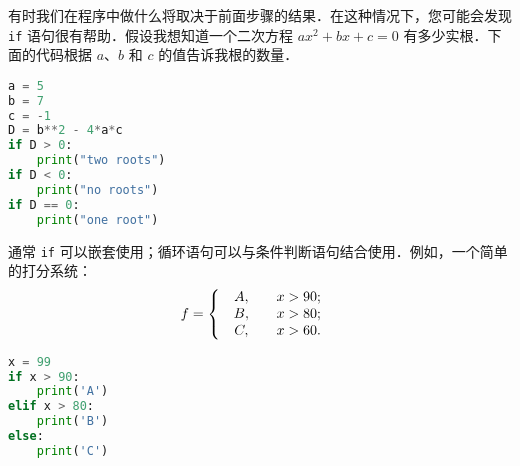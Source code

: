 有时我们在程序中做什么将取决于前面步骤的结果．在这种情况下，您可能会发现 \verb|if| 语句很有帮助．假设我想知道一个二次方程 $ax^2+bx+c=0$ 有多少实根．下面的代码根据 $a$、$b$ 和 $c$ 的值告诉我根的数量．
\begin{lstlisting}[language=python]
a = 5
b = 7
c = -1 
D = b**2 - 4*a*c
if D > 0:
    print("two roots")
if D < 0:
    print("no roots")
if D == 0:
    print("one root")
\end{lstlisting}

通常 \verb|if| 可以嵌套使用；循环语句可以与条件判断语句结合使用．例如，一个简单的打分系统：
\begin{equation}
f=\left\{\begin{array}{lc}\begin{array}{c}A, \\B, \\C, \end{array}&\begin{array}{c}x>90; \\x>80; \\x>60.\end{array}\end{array}\right.\\\\
\end{equation}
\begin{lstlisting}[language=python]
x = 99
if x > 90:
    print('A')
elif x > 80:
    print('B')
else:
    print('C')
\end{lstlisting}
